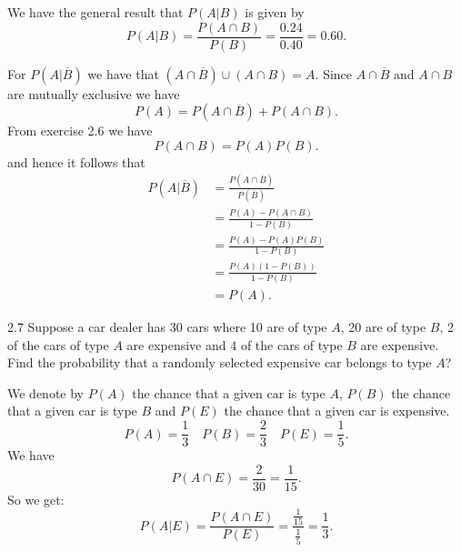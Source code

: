 \begin{derivation}
  We have the general result that $P(A|B)$ is given by
  \begin{equation*}
    P(A|B) = \frac{P(A \cap B)}{P(B)} = \frac{\num{0,24}}{\num{0,40}} = \num{0,60}
  .\end{equation*}
  
  For $P(A | \overline{B})$ we have that $(A \cap \overline{B}) \cup (A \cap B) = A$. Since $A \cap \overline{B}$ and $A \cap B$ are mutually exclusive we have
  \begin{equation*}
    P (A) = P(A \cap \overline{B}) + P(A \cap B)
  .\end{equation*}
  From exercise 2.6 we have
  \begin{equation*}
    P(A \cap B) = P(A) P(B) 
  .\end{equation*}
  and hence it follows that
  \begin{align*}
    P(A| \overline{B}) &= \frac{P(A \cap \overline{B})}{P(\overline{B})} \\
    &= \frac{P(A) - P(A \cap B)}{1 - P(B)} \\
    &= \frac{P(A) - P(A)P(B)}{1 - P(B)} \\
    &= \frac{P(A) \left( 1 - P(B) \right)}{1-P(B)} \\
    &= P(A)
  .\end{align*}
\end{derivation}


\begin{problem}{2.7}
  Suppose a car dealer has 30 cars where 10 are of type $A$, 20 are of type $B$, 2 of the cars of type $A$ are expensive and 4 of the cars of type $B$ are expensive. 
  Find the probability that a randomly selected expensive car belongs to type $A$?
\end{problem}

\begin{derivation}
  We denote by $P(A)$ the chance that a given car is type $A$, $P(B)$ the chance that a given car is type $B$ and $P(E)$ the chance that a given car is expensive.
  \begin{equation*}
    P(A) = \frac{1}{3} \quad P(B) = \frac{2}{3} \quad P(E) = \frac{1}{5}
  .\end{equation*}
  We have
  \begin{equation*}
    P(A \cap E) = \frac{2}{30} = \frac{1}{15}
  .\end{equation*}
  So we get:
  \begin{equation*}
    P(A|E) = \frac{P(A \cap E)}{P(E)} = \frac{\frac{1}{15}}{\frac{1}{5}} = \frac{1}{3}
  .\end{equation*}
\end{derivation}


